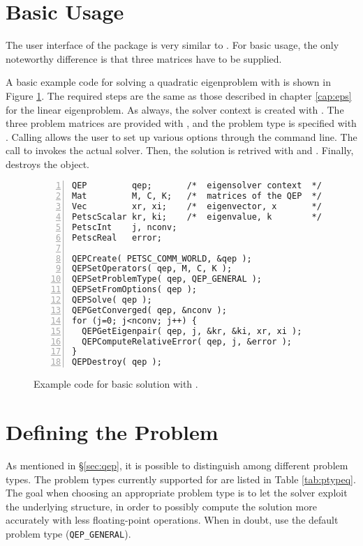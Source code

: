 \section{Basic Usage}

The user interface of the  package is very similar to . For basic usage, the only noteworthy difference is that three matrices have to be supplied.

A basic example code for solving a quadratic eigenproblem with  is shown in Figure \ref{fig:ex-qep}. The required steps are the same as those described in chapter \ref{cap:eps} for the linear eigenproblem. As always, the solver context is created with . The three problem matrices are provided with , and the problem type is specified with . Calling  allows the user to set up various options through the command line. The call to  invokes the actual solver. Then, the solution is retrived with  and . Finally,  destroys the object.

\begin{figure}
\begin{Verbatim}[fontsize=\small,numbers=left,numbersep=6pt,xleftmargin=15mm]
QEP         qep;       /*  eigensolver context  */
Mat         M, C, K;   /*  matrices of the QEP  */
Vec         xr, xi;    /*  eigenvector, x       */
PetscScalar kr, ki;    /*  eigenvalue, k        */
PetscInt    j, nconv;
PetscReal   error;

QEPCreate( PETSC_COMM_WORLD, &qep );
QEPSetOperators( qep, M, C, K );
QEPSetProblemType( qep, QEP_GENERAL );
QEPSetFromOptions( qep );
QEPSolve( qep );
QEPGetConverged( qep, &nconv );
for (j=0; j<nconv; j++) {
  QEPGetEigenpair( qep, j, &kr, &ki, xr, xi );
  QEPComputeRelativeError( qep, j, &error );
}
QEPDestroy( qep );
\end{Verbatim}
\caption{\label{fig:ex-qep}Example code for basic solution with .}
\end{figure}


\section{Defining the Problem}

As mentioned in \S\ref{sec:qep}, it is possible to distinguish among different problem types. The problem types currently supported for  are listed in Table \ref{tab:ptypeq}. The goal when choosing an appropriate problem type is to let the solver exploit the underlying structure, in order to possibly compute the solution more accurately with less floating-point operations. When in doubt, use the default problem type (\texttt{QEP\_GENERAL}). 

